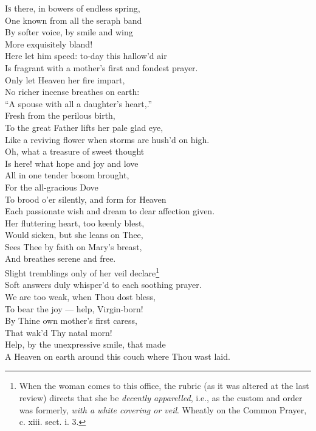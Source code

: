 \textsc{Is} there, in bowers of endless spring, \\
 One known from all the seraph band \\
 By softer voice, by smile and wing \\
 More exquisitely bland! \\
 Here let him speed: to-day this hallow’d air \\
 Is fragrant with a mother’s first and fondest prayer. \\
  Only let Heaven her fire impart, \\
 No richer incense breathes on earth: \\
 “A spouse with all a daughter’s heart,.” \\
 Fresh from the perilous birth, \\
 To the great Father lifts her pale glad eye, \\
 Like a reviving flower when storms are hush’d on high. \\
  Oh, what a treasure of sweet thought \\
 Is here! what hope and joy and love \\
 All in one tender bosom brought, \\
 For the all-gracious Dove \\
 To brood o’er silently, and form for Heaven \\
 Each passionate wish and dream to dear affection given. \\
  Her fluttering heart, too keenly blest, \\
 Would sicken, but she leans on Thee, \\
 Sees Thee by faith on Mary’s breast, \\
 And breathes serene and free. \\
 Slight tremblings only of her veil declare\footnote{When the woman comes to this office, the rubric (as it was altered at the last review) directs that she be \emph{decently apparelled}, i.e., as the custom and order was formerly, \emph{with a white covering or veil}. Wheatly on the Common Prayer, c. xiii. sect. i. 3.} \\
 Soft answers duly whisper’d to each soothing prayer. \\
  We are too weak, when Thou dost bless, \\
 To bear the joy — help, Virgin-born! \\
 By Thine own mother’s first caress, \\
 That wak’d Thy natal morn! \\
 Help, by the unexpressive smile, that made \\
 A Heaven on earth around this couch where Thou wast laid.\\

